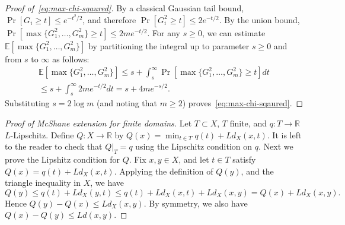 \documentclass{amsart}
\newcommand{\E}{\mathbb E}
\begin{document}
\begin{proof}[Proof of~\eqref{eq:max-chi-sqaured}]
    By a classical Gaussian tail bound, $\Pr[G_i\ge t] \le e^{-t^2/2}$, and therefore $\Pr[G_i^2\ge t] \le 2e^{-t/2}$.  By the union bound,
$\Pr[ \max\{G_1^2,\ldots,G_m^2\}\ge t]\le 2me^{-t/2}$. 
For any $s\ge 0$, we can estimate $\E[\max\{G_1^2,\ldots,G_m^2\}]$ 
by partitioning the integral up to parameter $s\ge 0$ and from $s$ to $\infty$ as follows:
\begin{multline*}
\E[\max\{G_1^2,\ldots,G_m^2\}] \le s+ \int_s^\infty \Pr \left [\max\{G_1^2,\ldots,G_m^2\} \ge t\right ] dt\\
 \le s+ \int_s^\infty 2m e^{-t/2}dt
 = s+4m e^{-s/2}.
\end{multline*}
Substituting $s=2\log m$ (and noting that $m\ge2$) 
proves~\eqref{eq:max-chi-sqaured}. 
\end{proof}

\begin{proof}[Proof of McShane extension for finite domains]
    Let $T\subset X$,  $T$ finite, and $q:T\to \mathbb R$ $L$-Lipschitz.
    Define $Q:X\to \mathbb R$ by
    \( Q(x) =\min_{t\in T} q(t)+ L d_X(x,t) \).
It is left to the reader to check that $Q|_T=q$  using the Lipschitz condition on $q$.
    Next we prove the Lipshitz condition for $Q$. Fix $x,y\in X$, and let $t\in T$
    satisfy $Q(x)=q(t)+L d_X(x,t)$. Applying the definition of $Q(y)$, and the triangle inequality in $X$, we have
    \[ Q(y)\le q(t)+Ld_X(y,t) \le q(t)+Ld_X(x,t)+Ld_X(x,y)= Q(x)+ Ld_X(x,y).
    \]
    Hence $Q(y)-Q(x)\le Ld_X(x,y)$. By symmetry, we also have
    $Q(x)-Q(y)\le Ld(x,y)$.   
\end{proof}
\end{document}
